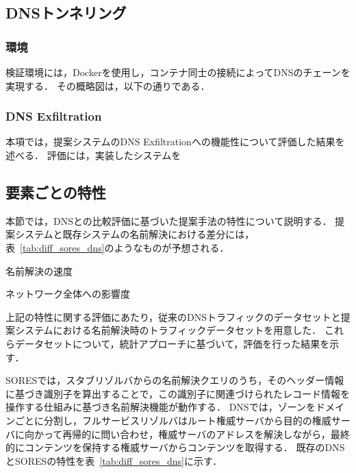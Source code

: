 \subsection{DNSトンネリング}
\label{sec:eval-tunnel}
\subsubsection{環境}
検証環境には，Dockerを使用し，コンテナ同士の接続によってDNSのチェーンを実現する．
その概略図は，以下の通りである．


\subsubsection{DNS Exfiltration}
本項では，提案システムのDNS Exfiltrationへの機能性について評価した結果を述べる．
評価には，実装したシステムを


\subsection{要素ごとの特性}
\label{sec:eval-feature}
本節では，DNSとの比較評価に基づいた提案手法の特性について説明する．
提案システムと既存システムの名前解決における差分には，表~\ref{tab:diff_sores_dns}のようなものが予想される．



\begin{description}
 \setlength{\itemsep}{0pt}
 \setlength{\leftskip}{1.0cm}
 \item[RTT:] 名前解決の速度
 \item[トラフィック量:] ネットワーク全体への影響度
\end{description}

上記の特性に関する評価にあたり，従来のDNSトラフィックのデータセットと提案システムにおける名前解決時のトラフィックデータセットを用意した．
これらデータセットについて，統計アプローチに基づいて，評価を行った結果を示す．

SORESでは，スタブリゾルバからの名前解決クエリのうち，そのヘッダー情報に基づき識別子を算出することで，この識別子に関連づけられたレコード情報を操作する仕組みに基づき名前解決機能が動作する．
DNSでは，ゾーンをドメインごとに分割し，フルサービスリゾルバはルート権威サーバから目的の権威サーバに向かって再帰的に問い合わせ，権威サーバのアドレスを解決しながら，最終的にコンテンツを保持する権威サーバからコンテンツを取得する．
既存のDNSとSORESの特性を表~\ref{tab:diff_sores_dns}に示す．


